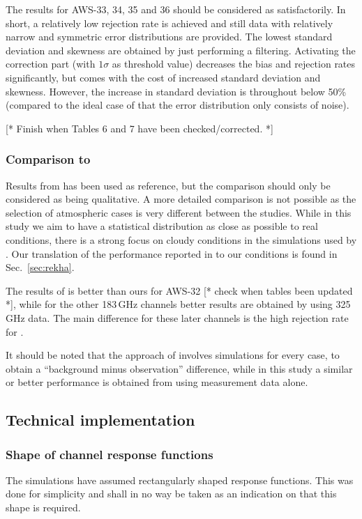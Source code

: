 \documentclass[12pt]{article}
\begin{document}
The results for AWS-33, 34, 35 and 36 should be considered as satisfactorily.
In short, a relatively low rejection rate is achieved and still data with
relatively narrow and symmetric error distributions are provided. The lowest
standard deviation and skewness are obtained by just performing a filtering.
Activating the correction part (with $1\sigma$ as threshold value) decreases
the bias and rejection rates significantly, but comes with the cost of
increased standard deviation and skewness. However, the increase in standard
deviation is throughout below 50\% (compared to the ideal case of that the
error distribution only consists of noise).

[* Finish when Tables 6 and 7 have been checked/corrected. *]


\subsubsection{Comparison to \citet{rekha2012potential}}
%
Results from \citet{rekha2012potential} has been used as reference, but the
comparison should only be considered as being qualitative. A more detailed
comparison is not possible as the selection of atmospheric cases is very
different between the studies. While in this study we aim to have a statistical
distribution as close as possible to real conditions, there is a strong focus on
cloudy conditions in the simulations used by \citet{rekha2012potential}. Our
translation of the performance reported in \citet{rekha2012potential} to our
conditions is found in Sec.~\ref{sec:rekha}.

The results of \citet{rekha2012potential} is better than ours for AWS-32 [*
check when tables been updated *], while for the other 183\,GHz channels better
results are obtained by using 325\,GHz data. The main difference for these
later channels is the high rejection rate for \citet{rekha2012potential}.

It should be noted that the approach of \citet{rekha2012potential} involves
simulations for every case, to obtain a ``background minus observation''
difference, while in this study a similar or better performance is obtained
from using measurement data alone.




\subsection{Technical implementation}

\subsubsection{Shape of channel response functions}
%
The simulations have assumed rectangularly shaped response functions. This was
done for simplicity and shall in no way be taken as an indication on that this
shape is required.
\end{document}
